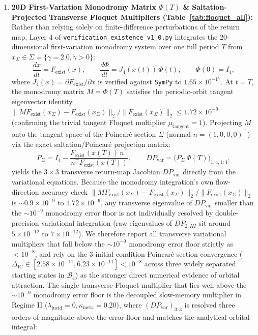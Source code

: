 \documentclass[11pt,a4paper]{article}
\theoremstyle{definition}
\begin{document}
\begin{enumerate}
  \item \textbf{20D First-Variation Monodromy Matrix $\Phi(T)$ \& Saltation-Projected Transverse Floquet Multipliers (Table~\ref{tab:floquet_all}):} Rather than relying solely on finite-difference perturbations of the return map, Layer 4 of \texttt{verification\_existence\_v1\_0.py} integrates the 20-dimensional first-variation monodromy system over one full period $T$ from $x_\Sigma \in \Sigma = \{\gamma = 2.0, \dot{\gamma} > 0\}$:
  \begin{equation}
  \label{eq:variational_ode}
  \frac{dx}{dt} = F_{\mathrm{exist}}(x), \qquad \frac{d\Phi}{dt} = J_4(x(t))\,\Phi(t), \qquad \Phi(0) = I_4,
  \end{equation}
  where $J_4(x) = \partial F_{\mathrm{exist}}/\partial x$ is verified against \texttt{SymPy} to $1.65 \times 10^{-17}$. At $t = T$, the monodromy matrix $M = \Phi(T)$ satisfies the periodic-orbit tangent eigenvector identity $\|M F_{\mathrm{exist}}(x_\Sigma) - F_{\mathrm{exist}}(x_\Sigma)\|_2 / \|F_{\mathrm{exist}}(x_\Sigma)\|_2 \le 1.72 \times 10^{-9}$ (confirming the trivial tangent Floquet multiplier $\mu_{\mathrm{tangent}} = 1$). Projecting $M$ onto the tangent space of the Poincar\'e section $\Sigma$ (normal $n = (1,0,0,0)^\top$) via the exact saltation/Poincar\'e projection matrix:
  \begin{equation}
  \label{eq:saltation_proj}
  P_{\Sigma} = I_4 - \frac{F_{\mathrm{exist}}(x(T))\,n^\top}{n^\top F_{\mathrm{exist}}(x(T))}, \qquad DP_{\mathrm{var}} = \bigl(P_{\Sigma}\,\Phi(T)\bigr)_{1:4, 1:4},
  \end{equation}
  yields the $3\times 3$ transverse return-map Jacobian $DP_{\mathrm{var}}$ directly from the variational equations. Because the monodromy integration's own flow-direction accuracy check $\|M F_{\mathrm{exist}}(x_\Sigma) - F_{\mathrm{exist}}(x_\Sigma)\|_2 / \|F_{\mathrm{exist}}(x_\Sigma)\|_2$ is $\sim 0.9 \times 10^{-9}$ to $1.72 \times 10^{-9}$, any transverse eigenvalue of $DP_{\mathrm{var}}$ smaller than the $\sim 10^{-9}$ monodromy error floor is not individually resolved by double-precision variational integration (raw eigenvalues of $DP_{2,H\dot{I}}$ sit around $5\times 10^{-12}$ to $7\times 10^{-12}$). We therefore report all transverse variational multipliers that fall below the $\sim 10^{-9}$ monodromy error floor strictly as $< 10^{-8}$, and rely on the 3-initial-condition Poincar\'e section convergence ($\Delta_{\mathrm{IC}} \in [2.58 \times 10^{-11}, 6.23 \times 10^{-11}] < 10^{-8}$ across three widely separated starting states in $\mathcal{B}_4$) as the stronger direct numerical evidence of orbital attraction. The single transverse Floquet multiplier that lies well above the $\sim 10^{-9}$ monodromy error floor is the decoupled slow-memory multiplier in Regime II ($\lambda_{\mathrm{lucid}} = 0, \kappa_{\mathrm{meta}} = 0.20$), where $(DP_{\mathrm{var}})_{3,3}$ is resolved three orders of magnitude above the error floor and matches the analytical orbital integral:

\end{enumerate}
\end{document}
